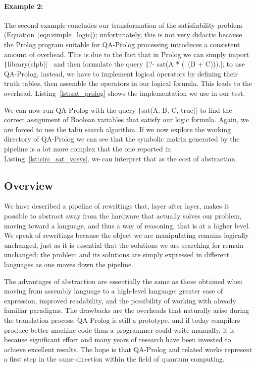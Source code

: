 {\paragraph{Example 2: }\label{ex:sat_prolog} The second example concludes our transformation of the satisfiability problem (Equation~\ref{eqn:simple_logic}); unfortunately, this is not very didactic because the Prolog program suitable for QA-Prolog processing introduces a consistent amount of overhead. This is due to the fact that in Prolog we can simply import \texttt|library(clpb)|~\cite{triska2018boolean} and then formulate the query \texttt|?- sat(A * (~(B + C))).|; to use QA-Prolog, instead, we have to implement logical operators by defining their truth tables, then assemble the operators in our logical formula. This leads to the overhead. Listing~\ref{lst:sat_prolog} shows the implementation we use in our test.
\begin{listingenv}[h]
	\caption{Satisfiability in Prolog}
	\label{lst:sat_prolog}
\end{listingenv}

We can now run QA-Prolog with the query \texttt|sat(A, B, C, true)| to find the correct assignment of Boolean variables that satisfy our logic formula. Again, we are forced to use the tabu search algorithm. If we now explore the working directory of QA-Prolog we can see that the symbolic matrix generated by the pipeline is a lot more complex that the one reported in Listing~\ref{lst:circ_sat_yosys}, we can interpret that as the cost of abstraction.

\subsection{Overview}
We have described a pipeline of rewritings that, layer after layer, makes it possible to abstract away from the hardware that actually solves our problem, moving toward a language, and thus a way of reasoning, that is at a higher level. We speak of rewritings because the object we are manipulating remains logically unchanged, just as it is essential that the solutions we are searching for remain unchanged; the problem and its solutions are simply expressed in different languages as one moves down the pipeline.

The advantages of abstraction are essentially the same as those obtained when moving from assembly language to a high-level language: greater ease of expression, improved readability, and the possibility of working with already familiar paradigms. The drawbacks are the overheads that naturally arise during the translation process. QA-Prolog is still a prototype, and if today compilers produce better machine code than a programmer could write manually, it is because significant effort and many years of research have been invested to achieve excellent results. The hope is that QA-Prolog and related works represent a first step in the same direction within the field of quantum computing.

}
